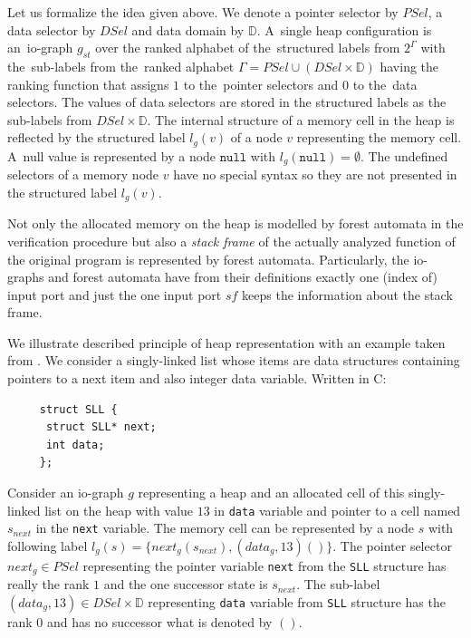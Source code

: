 Let us formalize the idea given above.
We denote a pointer selector by $PSel$, a data selector by $DSel$ and data domain by $\mathbb{D}$.
A~single heap configuration is an~io-graph $g_{st}$ over the ranked alphabet of the~structured labels from $2^\Gamma$
with the~sub-labels from the~ranked alphabet $\Gamma = PSel \cup (DSel \times \mathbb{D})$ having the
ranking function that assigns $1$ to the~pointer selectors and $0$ to the~data selectors.
The values of data selectors are stored in the structured labels as the sub-labels from $DSel \times \mathbb{D}$.
The internal structure of a memory cell in the heap
is reflected by the structured label $l_g(v)$ of a node $v$ representing the memory cell. 
A~null value is represented by a node $\texttt{null}$ with $l_g(\texttt{null}) = \emptyset$.
The undefined selectors of a memory node $v$ have no special syntax so they are
not presented in the structured label $l_g(v)$.

Not only the allocated memory on the heap is modelled by forest automata
in the verification procedure but also a \emph{stack frame} of the actually
analyzed function of the original program is represented by forest automata.
Particularly, the io-graphs and forest automata have from their definitions exactly one (index of) input port and
just the one input port $\mathit{sf}$ keeps the information about the stack frame.


\bexmp
We illustrate described principle of heap representation with an example taken from \cite{techrep}.
We consider a singly-linked list whose items are data structures containing pointers to
a next item and also integer data variable. Written in C:
\begin{center}
\begin{minipage}{0.3\textwidth}
    \begin{verbatim}
     struct SLL {
      struct SLL* next;
      int data;
     };
    \end{verbatim}
\end{minipage}
\end{center}
Consider an io-graph $g$ representing a heap and an allocated cell of this singly-linked list
on the heap with value $13$ in \texttt{data} variable and pointer to a cell named $s_{next}$
in the \texttt{next} variable.
The memory cell can be represented by a node $s$ with following label $l_g(s) = \{next_g(s_{next}),(data_g,13)()\}$.
The pointer selector $next_g \in PSel$ representing the pointer variable \texttt{next} from the \texttt{SLL} structure
has really the rank $1$ and the one successor state is $s_{next}$.
The sub-label $(data_g,13) \in DSel\times \mathbb{D}$ representing
\texttt{data} variable from \texttt{SLL} structure has the rank $0$
and has no successor what is denoted by $()$.
\eexmp

